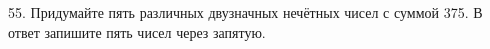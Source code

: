 55. Придумайте пять различных двузначных нечётных чисел с суммой 375. В ответ запишите пять чисел через запятую.\\
